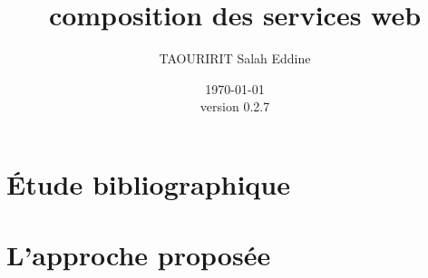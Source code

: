 \documentclass[a4paper, oneside, 12pt]{report}
\author{TAOURIRIT Salah Eddine}
\title{composition des services web}
\date{\today\\version 0.2.7}
\begin{document}
\let\Item\item \newcommand{\head}[1]{\textnormal{\textbf{#1}}}
\newcommand\SpecialItem{\renewcommand\item[1][]{\Item[\hspace{0.5cm}\textbullet~\sffamily ##1]}}
\newcommand\SpecialItemI{\renewcommand\item[1][]{\Item[\textendash~\sffamily ##1]}}

\renewcommand{\descriptionlabel}[1]{\hspace{0.5cm}\textbullet~\textsf{#1}}
\renewcommand\enddescription{\endlist\global\let\item\Item}

\renewcommand{\thesubsubsection}{} %
\newtheorem{mydef}{Definition}

\captionsetup[figure]{name=Figure.}
\captionsetup[table]{name=Table.}

\maketitle

\setcounter{secnumdepth}{4}
\setcounter{tocdepth}{2}

\tableofcontents



\printglossaries
\listoffigures
\listoftables
{}


\part{Étude bibliographique}



\part{L'approche proposée}






\begin{appendices}


\end{appendices}
\end{document}
